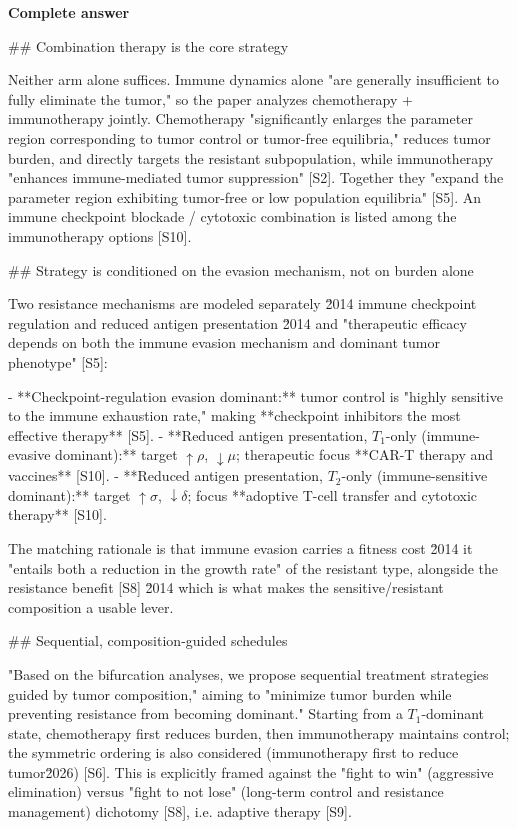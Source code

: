 \documentclass[10pt]{article}
\begin{document}
\textbf{Complete answer}
\begin{AnswerText}
## Combination therapy is the core strategy

Neither arm alone suffices. Immune dynamics alone "are generally insufficient to fully eliminate the tumor," so the paper analyzes chemotherapy + immunotherapy jointly. Chemotherapy "significantly enlarges the parameter region corresponding to tumor control or tumor-free equilibria," reduces tumor burden, and directly targets the resistant subpopulation, while immunotherapy "enhances immune-mediated tumor suppression" [S2]. Together they "expand the parameter region exhibiting tumor-free or low population equilibria" [S5]. An immune checkpoint blockade / cytotoxic combination is listed among the immunotherapy options [S10].

## Strategy is conditioned on the evasion mechanism, not on burden alone

Two resistance mechanisms are modeled separately \u2014 immune checkpoint regulation and reduced antigen presentation \u2014 and "therapeutic efficacy depends on both the immune evasion mechanism and dominant tumor phenotype" [S5]:

- **Checkpoint-regulation evasion dominant:** tumor control is "highly sensitive to the immune exhaustion rate," making **checkpoint inhibitors the most effective therapy** [S5].
- **Reduced antigen presentation, $T_1$-only (immune-evasive dominant):** target $\uparrow\rho$, $\downarrow\mu$; therapeutic focus **CAR-T therapy and vaccines** [S10].
- **Reduced antigen presentation, $T_2$-only (immune-sensitive dominant):** target $\uparrow\sigma$, $\downarrow\delta$; focus **adoptive T-cell transfer and cytotoxic therapy** [S10].

The matching rationale is that immune evasion carries a fitness cost \u2014 it "entails both a reduction in the growth rate" of the resistant type, alongside the resistance benefit [S8] \u2014 which is what makes the sensitive/resistant composition a usable lever.

## Sequential, composition-guided schedules

"Based on the bifurcation analyses, we propose sequential treatment strategies guided by tumor composition," aiming to "minimize tumor burden while preventing resistance from becoming dominant." Starting from a $T_1$-dominant state, chemotherapy first reduces burden, then immunotherapy maintains control; the symmetric ordering is also considered (immunotherapy first to reduce tumor\u2026) [S6]. This is explicitly framed against the "fight to win" (aggressive elimination) versus "fight to not lose" (long-term control and resistance management) dichotomy [S8], i.e. adaptive therapy [S9].


\end{AnswerText}
\end{document}
